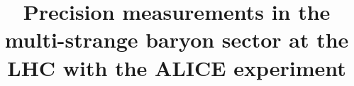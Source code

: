 \documentclass[ALICE,manyauthors]{cernphprep}
\begin{document}
%



\begin{titlepage}
	
	\title{Precision measurements in the \\multi-strange baryon sector at the LHC with the ALICE experiment}
	
%

\end{titlepage}
\setcounter{page}{2}








\tableofcontents

\cleardoublepage 
{} 




\cleardoublepage %
\end{document}
